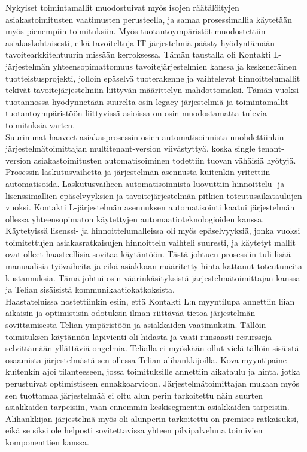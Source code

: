 \documentclass[finnish,12pt,a4paper,pdftex]{article}
\begin{document}
Nykyiset toimintamallit muodostuivat myös isojen räätälöityjen asiakastoimitusten vaatimusten perusteella, ja samaa prosessimallia käytetään myös pienempiin toimituksiin. Myös tuotantoympäristöt muodostettiin asiakaskohtaisesti, eikä tavoiteltuja IT-järjestelmiä päästy hyödyntämään tavoitearkkitehtuurin missään kerroksessa. Tämän taustalla oli Kontakti L-järjestelmän yhteensopimattomuus tavoitejärjestelmien kanssa ja keskeneräinen tuotteistusprojekti, jolloin epäselvä tuoterakenne ja vaihtelevat hinnoittelumallit tekivät tavoitejärjestelmiin liittyvän määrittelyn mahdottomaksi. Tämän vuoksi tuotannossa hyödynnetään suurelta osin legacy-järjestelmiä ja toimintamallit tuotantoympäristöön liittyvissä asioissa on osin muodostamatta tulevia toimituksia varten.\\

Suurimmat haaveet asiakasprosessin osien automatisoinnista unohdettiinkin järjestelmätoimittajan multitenant-version viivästyttyä, koska single tenant-version asiakastoimitusten automatisoiminen todettiin tuovan vähäisiä hyötyjä. Prosessin laskutusvaihetta ja järjestelmän asennusta kuitenkin yritettiin automatisoida. Laskutusvaiheen automatisoinnista luovuttiin hinnoittelu- ja lisenssimallien epäselvyyksien ja tavoitejärjestelmän pitkien toteutusaikataulujen vuoksi. Kontakti L-järjestelmän asennuksen automatisointi kaatui järjestelmän ollessa yhteensopimaton käytettyjen automaatioteknologioiden kanssa.\\ 

\noindent Käytetyissä lisenssi- ja hinnoittelumalleissa oli myös epäselvyyksiä, jonka vuoksi toimitettujen asiakasratkaisujen hinnoittelu vaihteli suuresti, ja käytetyt mallit ovat olleet haasteellisia sovitaa käytäntöön. Tästä johtuen prosessiin tuli lisää manuaalisia työvaiheita ja eikä asiakkaan määritetty hinta kattanut toteutuneita kustannuksia. Tämä johtui osin väärinkäsityksistä järjestelmätoimittajan kanssa ja Telian sisäisistä kommunikaatiokatkoksista.\\

\noindent Haastateluissa nostettiinkin esiin, että Kontakti L:n myyntilupa annettiin liian aikaisin ja optimistisin odotuksin ilman riittävää tietoa järjestelmän sovittamisesta Telian ympäristöön ja asiakkaiden vaatimuksiin. Tällöin toimituksen käytännön läpivienti oli hidasta ja vaati runsaasti resursseja selvittämään yllättäviä ongelmia. Telialla ei myöskään ollut vielä tällöin sisäistä osaamista järjestelmästä sen ollessa Telian alihankkijoilla. Kova myyntipaine kuitenkin ajoi tilanteeseen, jossa toimituksille annettiin aikataulu ja hinta, jotka perustuivat optimistiseen ennakkoarvioon. Järjestelmätoimittajan mukaan myös sen tuottamaa järjestelmää ei oltu alun perin tarkoitettu näin suurten asiakkaiden tarpeisiin, vaan ennemmin keskisegmentin asiakkaiden tarpeisiin. Alihankkijan järjestelmä myös oli alunperin tarkoitettu on premises-ratkaisuksi, eikä se siksi ole helposti sovitettavissa yhteen pilvipalveluna toimivien komponenttien kanssa.\\
\end{document}
